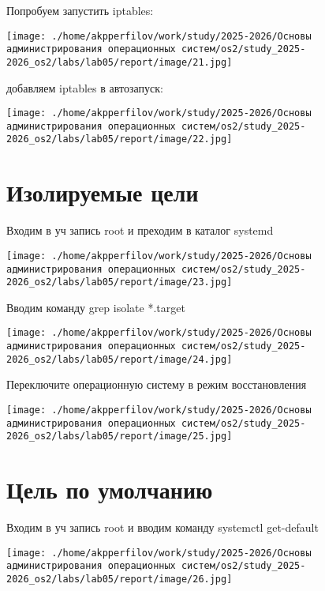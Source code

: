 \documentclass[
  english,
  russian,
  12pt,
  a4paper,
  DIV=11,
  numbers=noendperiod]{scrreprt}
\begin{document}
Попробуем запустить iptables:

\texttt{[image: ./home/akpperfilov/work/study/2025-2026/Основы администрирования операционных систем/os2/study\_2025-2026\_os2/labs/lab05/report/image/21.jpg]}

добавляем iptables в автозапуск:

\texttt{[image: ./home/akpperfilov/work/study/2025-2026/Основы администрирования операционных систем/os2/study\_2025-2026\_os2/labs/lab05/report/image/22.jpg]}

\chapter{Изолируемые
цели}\label{ux438ux437ux43eux43bux438ux440ux443ux435ux43cux44bux435-ux446ux435ux43bux438}

Входим в уч запись root и преходим в каталог systemd

\texttt{[image: ./home/akpperfilov/work/study/2025-2026/Основы администрирования операционных систем/os2/study\_2025-2026\_os2/labs/lab05/report/image/23.jpg]}

Вводим команду grep isolate *.target

\texttt{[image: ./home/akpperfilov/work/study/2025-2026/Основы администрирования операционных систем/os2/study\_2025-2026\_os2/labs/lab05/report/image/24.jpg]}

Переключите операционную систему в режим восстановления

\texttt{[image: ./home/akpperfilov/work/study/2025-2026/Основы администрирования операционных систем/os2/study\_2025-2026\_os2/labs/lab05/report/image/25.jpg]}

\chapter{Цель по
умолчанию}\label{ux446ux435ux43bux44c-ux43fux43e-ux443ux43cux43eux43bux447ux430ux43dux438ux44e}

Входим в уч запись root и вводим команду systemctl get-default

\texttt{[image: ./home/akpperfilov/work/study/2025-2026/Основы администрирования операционных систем/os2/study\_2025-2026\_os2/labs/lab05/report/image/26.jpg]}
\end{document}
